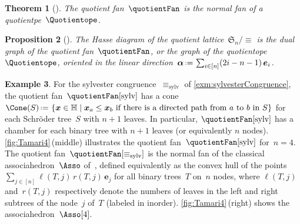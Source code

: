 \documentclass{amsart}
\newtheorem{theorem}{Theorem}[section]
\newtheorem{proposition}[theorem]{Proposition}
\theoremstyle{definition}
\newtheorem{example}[theorem]{Example}
\newcommand{\f}[1]{{\mathfrak{#1}}} %
\renewcommand{\b}[1]{{\boldsymbol{#1}}} %
\newcommand{\set}[2]{\left\{ #1 \;\middle|\; #2 \right\}} %
\newcommand{\eqdef}{\mbox{\,\raisebox{0.2ex}{\scriptsize\ensuremath{\mathrm:}}\ensuremath{=}\,}} %
\newcommand{\darkblue}{\color{darkblue}} %
\newcommand{\defn}[1]{\textsl{\darkblue #1}} %
\newcommand{\hyp}{\mathbb{H}} %
\begin{document}
\begin{theorem}[\cite{PilaudSantos-quotientopes, PadrolPilaudRitter}]
The quotient fan~$\quotientFan$ is the normal fan of a \defn{quotientpe}~$\Quotientope$.
\end{theorem}

\begin{proposition}[\cite{Reading-HopfAlgebras, PilaudSantos-quotientopes, PadrolPilaudRitter}]
The Hasse diagram of the quotient lattice~$\f{S}_n / {\equiv}$ is the dual graph of the quotient fan~$\quotientFan$, or the graph of the quotientope~$\Quotientope$, oriented in the linear direction~$\b{\alpha} \eqdef \sum_{i \in [n]} (2i-n-1) \, \b{e}_i$.
\end{proposition}

\begin{example}
\label{exm:sylvesterFanAssociahedron}
For the sylvester congruence~$\equiv_\textrm{sylv}$ of \cref{exm:sylvesterCongruence}, the quotient fan~$\quotientFan[\textrm{sylv}]$ has a cone~$\Cone(S) \eqdef \set{\b{x} \in \hyp}{\b{x}_a \le \b{x}_b \text{ if there is a directed path from } a \text{ to } b \text{ in } S}$ for each Schröder tree~$S$ with $n+1$ leaves.
In particular, $\quotientFan[\textrm{sylv}]$ has a chamber for each binary tree with $n+1$ leaves (or equivalently $n$ nodes).
\cref{fig:Tamari4}\,(middle) illustrates the quotient fan~$\quotientFan[\textrm{sylv}]$ for~$n = 4$.
The quotient fan~$\quotientFan[\equiv_\textrm{sylv}]$ is the normal fan of the classical associahedron~$\Asso$ of~\cite{ShniderSternberg, Loday}, defined equivalently as the convex hull of the points~$\sum_{j \in [n]} \ell(T,j) \, r(T,j) \, \b{e}_j$ for all binary trees~$T$ on~$n$ nodes, where $\ell(T,j)$ and~$r(T,j)$ respectively denote the numbers of leaves in the left and right subtrees of the node~$j$ of~$T$ (labeled in inorder).
\cref{fig:Tamari4}\,(right) shows the associahedron~$\Asso[4]$.
%
\begin{figure}
	\capstart

\end{figure}
\end{example}
\end{document}
